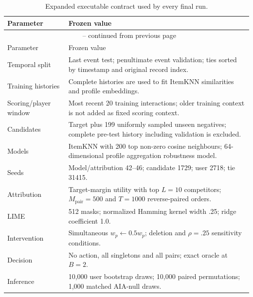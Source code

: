 \begin{longtable}{@{}p{}p{}@{}}
\caption{Expanded executable contract used by every final run.}\label{tab:S7}\\
\toprule
Parameter & Frozen value \\
\midrule
\endfirsthead
\multicolumn{2}{c}{\tablename\ \thetable{} -- continued from previous page}\\
\toprule
Parameter & Frozen value \\
\midrule
\endhead
\bottomrule
\endfoot
\bottomrule
\endlastfoot
Temporal split & Last event test; penultimate event validation; ties sorted by timestamp and original record index. \\
Training histories & Complete histories are used to fit ItemKNN similarities and profile embeddings. \\
Scoring/player window & Most recent 20 training interactions; older training context is not added as fixed scoring context. \\
Candidates & Target plus 199 uniformly sampled unseen negatives; complete pre-test history including validation is excluded. \\
Models & ItemKNN with 200 top non-zero cosine neighbours; 64-dimensional profile aggregation robustness model. \\
Seeds & Model/attribution 42--46; candidate 1729; user 2718; tie 31415. \\
Attribution & Target-margin utility with top $L=10$ competitors; $M_{\mathrm{pair}}=500$ and $T=1000$ reverse-paired orders. \\
LIME & 512 masks; normalized Hamming kernel width .25; ridge coefficient 1.0. \\
Intervention & Simultaneous $w_p\leftarrow0.5w_p$; deletion and $\rho=.25$ sensitivity conditions. \\
Decision & No action, all singletons and all pairs; exact oracle at $B=2$. \\
Inference & 10,000 user bootstrap draws; 10,000 paired permutations; 1,000 matched AIA-null draws. \\
\end{longtable}
